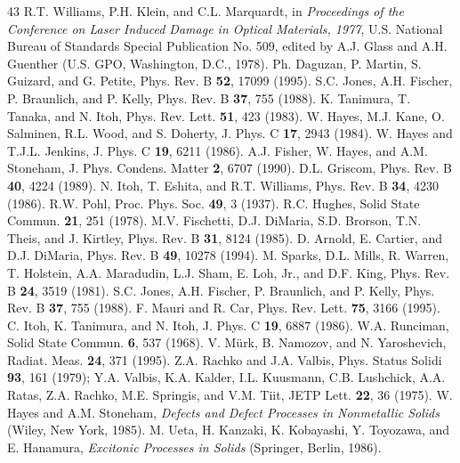 \documentclass[aps,prb,reprint]{revtex4-2}
\begin{document}
\begin{thebibliography}{43}
 R.T. Williams, P.H. Klein, and C.L. Marquardt, in \textit{Proceedings of the Conference on Laser Induced Damage in Optical Materials, 1977}, U.S. National Bureau of Standards Special Publication No. 509, edited by A.J. Glass and A.H. Guenther (U.S. GPO, Washington, D.C., 1978).
 Ph. Daguzan, P. Martin, S. Guizard, and G. Petite, Phys. Rev. B \textbf{52}, 17099 (1995).
 S.C. Jones, A.H. Fischer, P. Braunlich, and P. Kelly, Phys. Rev. B \textbf{37}, 755 (1988).
 K. Tanimura, T. Tanaka, and N. Itoh, Phys. Rev. Lett. \textbf{51}, 423 (1983).
 W. Hayes, M.J. Kane, O. Salminen, R.L. Wood, and S. Doherty, J. Phys. C \textbf{17}, 2943 (1984).
 W. Hayes and T.J.L. Jenkins, J. Phys. C \textbf{19}, 6211 (1986).
 A.J. Fisher, W. Hayes, and A.M. Stoneham, J. Phys. Condens. Matter \textbf{2}, 6707 (1990).
 D.L. Griscom, Phys. Rev. B \textbf{40}, 4224 (1989).
 N. Itoh, T. Eshita, and R.T. Williams, Phys. Rev. B \textbf{34}, 4230 (1986).
 R.W. Pohl, Proc. Phys. Soc. \textbf{49}, 3 (1937).
 R.C. Hughes, Solid State Commun. \textbf{21}, 251 (1978).
 M.V. Fischetti, D.J. DiMaria, S.D. Brorson, T.N. Theis, and J. Kirtley, Phys. Rev. B \textbf{31}, 8124 (1985).
 D. Arnold, E. Cartier, and D.J. DiMaria, Phys. Rev. B \textbf{49}, 10278 (1994).
 M. Sparks, D.L. Mills, R. Warren, T. Holstein, A.A. Maradudin, L.J. Sham, E. Loh, Jr., and D.F. King, Phys. Rev. B \textbf{24}, 3519 (1981).
 S.C. Jones, A.H. Fischer, P. Braunlich, and P. Kelly, Phys. Rev. B \textbf{37}, 755 (1988).
 F. Mauri and R. Car, Phys. Rev. Lett. \textbf{75}, 3166 (1995).
 C. Itoh, K. Tanimura, and N. Itoh, J. Phys. C \textbf{19}, 6887 (1986).
 W.A. Runciman, Solid State Commun. \textbf{6}, 537 (1968).
 V. M\"urk, B. Namozov, and N. Yaroshevich, Radiat. Meas. \textbf{24}, 371 (1995).
 Z.A. Rachko and J.A. Valbis, Phys. Status Solidi \textbf{93}, 161 (1979); Y.A. Valbis, K.A. Kalder, I.L. Kuusmann, C.B. Lushchick, A.A. Ratas, Z.A. Rachko, M.E. Springis, and V.M. Tiit, JETP Lett. \textbf{22}, 36 (1975).
 W. Hayes and A.M. Stoneham, \textit{Defects and Defect Processes in Nonmetallic Solids} (Wiley, New York, 1985).
 M. Ueta, H. Kanzaki, K. Kobayashi, Y. Toyozawa, and E. Hanamura, \textit{Excitonic Processes in Solids} (Springer, Berlin, 1986).
\end{thebibliography}
\end{document}
